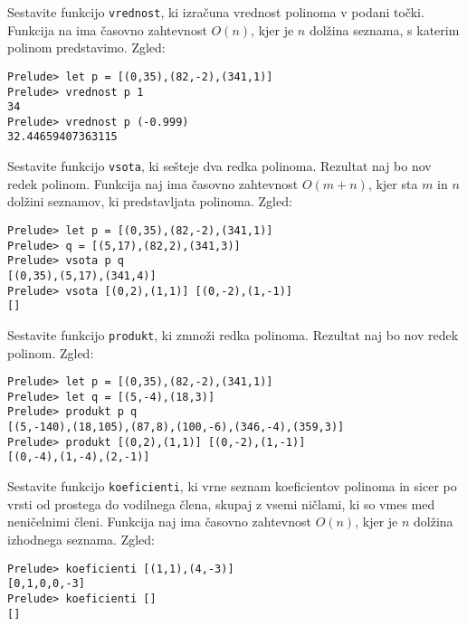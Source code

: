 \documentclass[arhiv]{../izpit}
\begin{document}
\podnaloga[10 točk]
Sestavite funkcijo \verb+vrednost+, ki izračuna vrednost polinoma v podani točki. Funkcija na ima časovno zahtevnost $O(n)$, kjer je $n$ dolžina seznama, s katerim polinom predstavimo. Zgled:
\begin{verbatim}
Prelude> let p = [(0,35),(82,-2),(341,1)]
Prelude> vrednost p 1
34
Prelude> vrednost p (-0.999)
32.44659407363115
\end{verbatim}

\podnaloga[10 točk]
Sestavite funkcijo \verb+vsota+, ki sešteje dva redka polinoma. Rezultat naj bo nov redek polinom. Funkcija naj ima časovno zahtevnost $O(m + n)$, kjer sta $m$ in $n$ dolžini seznamov, ki predstavljata polinoma. Zgled:

\begin{verbatim}
Prelude> let p = [(0,35),(82,-2),(341,1)]
Prelude> q = [(5,17),(82,2),(341,3)]
Prelude> vsota p q
[(0,35),(5,17),(341,4)]
Prelude> vsota [(0,2),(1,1)] [(0,-2),(1,-1)]
[]
\end{verbatim}

\podnaloga[10 točk]
Sestavite funkcijo \verb+produkt+, ki zmnoži redka polinoma. Rezultat naj bo nov redek polinom. %
Zgled:

\begin{verbatim}Prelude> let p = [(0,35),(82,-2),(341,1)]
Prelude> let q = [(5,-4),(18,3)]
Prelude> produkt p q
[(5,-140),(18,105),(87,8),(100,-6),(346,-4),(359,3)]
Prelude> produkt [(0,2),(1,1)] [(0,-2),(1,-1)]
[(0,-4),(1,-4),(2,-1)]
\end{verbatim}

\podnaloga[10 točk]
Sestavite funkcijo \verb+koeficienti+, ki vrne seznam koeficientov polinoma in sicer po vrsti od
prostega do vodilnega člena, skupaj z vsemi ničlami, ki so vmes med neničelnimi členi. Funkcija naj ima časovno zahtevnost $O(n)$, kjer je $n$ dolžina izhodnega seznama. Zgled:

\begin{verbatim}Prelude> koeficienti [(1,1),(4,-3)]
[0,1,0,0,-3]
Prelude> koeficienti []
[]
\end{verbatim}
\end{document}
